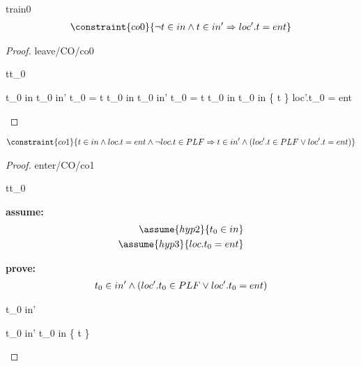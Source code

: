 \documentclass[12pt]{amsart}
\begin{document}
\begin{machine}{train0}
%
\begin{align*}
\constraint{co0}
{	\neg t \in in \land t \in in' \implies  loc'.t = ent } %
\end{align*}
%
\begin{proof}{leave/CO/co0}
	\begin{free:var}{t}{t_0}

	\begin{calculation}
		\neg t_0 \in in \land t_0 \in in'
	\hint{=}{ \ref{grd0} }
		\neg t_0 = t \land \neg t_0 \in in \land t_0 \in in' 
	\hint{=}{ \ref{a0} }
		\neg t_0 = t \land \neg t_0 \in in \land t_0 \in in \bunion \{ t \} 
		\false
		loc'.t_0 = ent
	\end{calculation}
	\end{free:var}
\end{proof}
%
\begin{align*}
\constraint{co1}
{	 t \in in \land loc.t = ent  \land \neg loc.t \in PLF 	
\implies t \in in' \land (loc'.t \in PLF \lor loc'.t = ent)	}
\end{align*}

\begin{proof}{enter/CO/co1}
	\begin{free:var}{t}{t_0}
	
	\noindent \textbf{assume:}
	\begin{align}
	\assume{hyp2}{t_0 \in in} \\ 
	\assume{hyp3}{ loc.t_0 = ent  }
	\end{align}
	
	\noindent \textbf{prove:}
	\begin{align*}
	 t_0 \in in' 
			\land (loc'.t_0 \in PLF \lor loc'.t_0 = ent)
	\end{align*}
	\begin{by:parts}
	
		\begin{part:a}{ t_0 \in in' }
		\begin{calculation}
			t_0 \in in'
		\hint{=}{ \ref{a1} }
			t_0 \in in \bunion \{ t \}
		\hint{=}{ \eqref{hyp2} }
			\true
		\end{calculation}


\end{part:a}
\end{by:parts}
\end{free:var}
\end{proof}
\end{machine}
\end{document}
